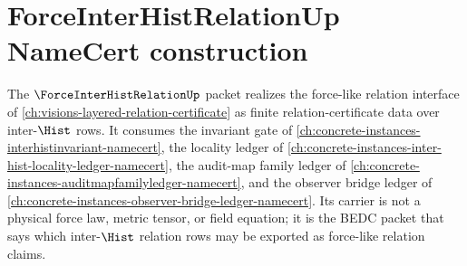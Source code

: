\chapter{ForceInterHistRelationUp NameCert construction}
\label{ch:concrete-instances-forceinterhistrelation-namecert}

The $\ForceInterHistRelationUp$ packet realizes the force-like relation interface of \autoref{ch:visions-layered-relation-certificate} as finite relation-certificate data over inter-$\Hist$ rows. It consumes the invariant gate of \autoref{ch:concrete-instances-interhistinvariant-namecert}, the locality ledger of \autoref{ch:concrete-instances-inter-hist-locality-ledger-namecert}, the audit-map family ledger of \autoref{ch:concrete-instances-auditmapfamilyledger-namecert}, and the observer bridge ledger of \autoref{ch:concrete-instances-observer-bridge-ledger-namecert}. Its carrier is not a physical force law, metric tensor, or field equation; it is the BEDC packet that says which inter-$\Hist$ relation rows may be exported as force-like relation claims.



